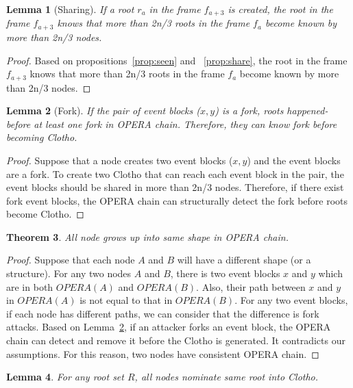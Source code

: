 \documentclass[preprint,12pt]{elsarticle}
\newtheorem{thm}{Theorem}[section]
\newtheorem{lem}[thm]{Lemma}
\begin{document}
\begin{lem}[Sharing]
\label{lem:share}
If a root $r_a$ in the frame $f_{a+3}$ is created, the root in the frame $f_{a+3}$ knows that more than 2n/3 roots in the frame $f_{a}$ become known by more than 2n/3 nodes.
\end{lem}

\begin{proof}
Based on propositions~\ref{prop:seen} and ~\ref{prop:share}, the root in the frame $f_{a+3}$ knows that more than 2n/3 roots in the frame $f_{a}$ become known by more than 2n/3 nodes. 
\end{proof}

\begin{lem}[Fork]
\label{lem:fork}
If the pair of event blocks ($x, y$) is a fork, roots happened-before at least one fork in OPERA chain. Therefore, they can know fork before becoming Clotho.
\end{lem}

\begin{proof}
Suppose that a node creates two event blocks ($x, y$) and the event blocks are a fork. To create two Clotho that can reach each event block in the pair, the event blocks should be shared in more than 2n/3 nodes. Therefore, if there exist fork event blocks, the OPERA chain can structurally detect the fork before roots become Clotho.
\end{proof}

\begin{thm}
\label{thm:same}
All node grows up into same shape in OPERA chain.
\end{thm}

\begin{proof}
Suppose that each node $A$ and $B$ will have a different shape (or a structure). For any two nodes $A$ and $B$, there is two event blocks $x$ and $y$ which are in both $OPERA(A)$ and $OPERA(B)$. Also, their path between $x$ and $y$ in $OPERA(A)$ is not equal to that in $OPERA(B)$. For any two event blocks, if each node has different paths, we can consider that the difference is fork attacks. Based on Lemma~\ref{lem:fork}, if an attacker forks an event block, the OPERA chain can detect and remove it before the Clotho is generated. It contradicts our assumptions. For this reason, two nodes have consistent OPERA chain. 
\end{proof}

\begin{lem}
\label{lem:root}
For any root set $R$, all nodes nominate same root into Clotho.
\end{lem}
\end{document}
